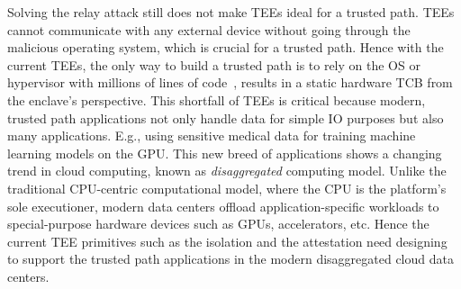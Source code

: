 Solving the relay attack still does not make TEEs ideal for a trusted path. TEEs cannot communicate with any external device without going through the malicious operating system, which is crucial for a trusted path. Hence with the current TEEs, the only way to build a trusted path is to rely on the OS or hypervisor with millions of lines of code~\cite{torvalds2020linux,barham2003xen}, results in a static hardware TCB from the enclave's perspective. This shortfall of TEEs is critical because modern, trusted path applications not only handle data for simple IO purposes but also many applications. E.g., using sensitive medical data for training machine learning models on the GPU. This new breed of applications shows a changing trend in cloud computing, known as \emph{disaggregated} computing model. Unlike the traditional CPU-centric computational model, where the CPU is the platform's sole executioner, modern data centers offload application-specific workloads to special-purpose hardware devices such as GPUs, accelerators, etc. Hence the current TEE primitives such as the isolation and the attestation need designing to support the trusted path applications in the modern disaggregated cloud data centers.   